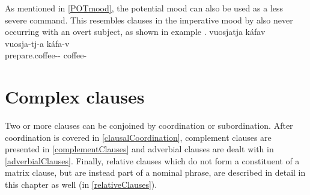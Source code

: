 As mentioned in \SEC\ref{POTmood}, the potential mood can also be used as a less severe command. This resembles clauses in the imperative mood by also never occurring with an overt subject, as shown %
in example . 
\ea\label{potSyntaxEx4}%
\glll	vuosjatja káfav\\
	vuosja-tj-a káfa-v\\
	prepare.coffee-- coffee-\\\nopagebreak
{}	
\z
{}





\chapter{Complex clauses}\label{complexClauses}%
Two or more clauses can be conjoined by coordination or subordination. %
After coordination is covered in \SEC\ref{clausalCoordination}, complement clauses are presented in \SEC\ref{complementClauses} and adverbial clauses are dealt with in \SEC\ref{adverbialClauses}. 
Finally, relative clauses which do not form a constituent of a matrix clause, but are instead part of a nominal phrase, are described in detail in this chapter as well (in \SEC\ref{relativeClauses}). 

